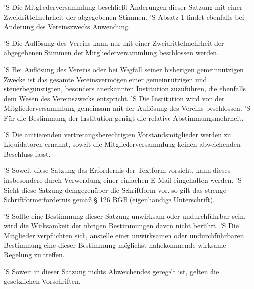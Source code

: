 \documentclass[a4paper,10pt]{scrreprt}
\begin{document}
\begin{contract}

'S Die Mitgliederversammlung beschließt Änderungen dieser Satzung mit einer
Zweidrittelmehrheit der abgegebenen Stimmen.
'S Absatz 1 findet ebenfalls bei Änderung des Vereinszwecks Anwendung.


'S Die Auflösung des Vereins kann nur mit einer Zweidrittelmehrheit der
abgegebenen Stimmen der Mitgliederversammlung beschlossen werden.

'S Bei Auflösung des Vereins oder bei Wegfall seiner bisherigen gemeinnützigen
Zwecke ist das gesamte Vereinsvermögen einer gemeinnützigen und
steuerbegünstigten, besonders anerkannten Institution zuzuführen, die ebenfalls
dem Wesen des Vereinszwecks entspricht.
'S Die Institution wird von der Mitgliederversammlung gemeinsam mit der
Auflösung des Vereins beschlossen.
'S Für die Bestimmung der Institution genügt die relative Abstimmungsmehrheit.

'S Die amtierenden vertretungsberechtigten Vorstandsmitglieder werden zu
Liquidatoren ernannt, soweit die Mitgliederversammlung keinen abweichenden
Beschluss fasst.


'S Soweit diese Satzung das Erfordernis der Textform vorsieht, kann dieses
insbesondere durch Verwendung einer einfachen E-Mail eingehalten werden.
'S Sieht diese Satzung demgegenüber die Schriftform vor, so gilt das strenge
Schriftformerfordernis gemäß § 126 BGB (eigenhändige Unterschrift).

'S Sollte eine Bestimmung dieser Satzung unwirksam oder undurchführbar sein,
wird die Wirksamkeit der übrigen Bestimmungen davon nicht berührt.
'S Die Mitglieder verpflichten sich, anstelle einer unwirksamen oder
undurchführbaren Bestimmung eine dieser Bestimmung möglichst nahekommende
wirksame Regelung zu treffen.

'S Soweit in dieser Satzung nichts Abweichendes geregelt ist, gelten die
gesetzlichen Vorschriften.
\end{contract}
\end{document}
